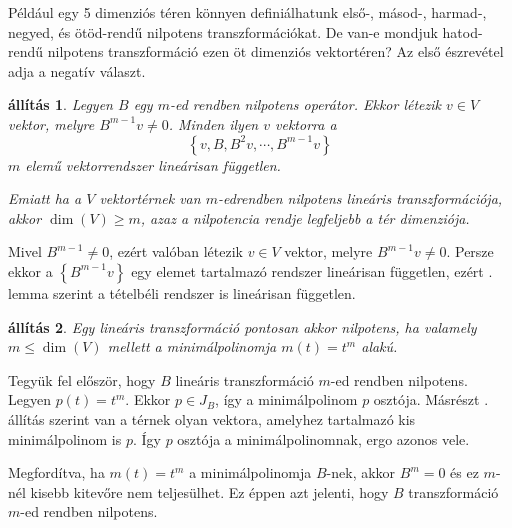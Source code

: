 \documentclass[a4paper, showtrims]{memoir}
\makeatletter
\renewenvironment{proof}[1][\proofname]
    {\par\pushQED{\qed}%
    \normalfont \topsep6\p@\@plus6\p@\relax
    \trivlist
    \item[\hskip\labelsep
        \itshape
    #1\@addpunct{:}]\ignorespaces}
    {\popQED\endtrivlist\@endpefalse}
\theoremstyle{plain}
\newtheorem{proposition}{állítás}[chapter]
\theoremstyle{remark}
\theoremstyle{definition}
\makeatother
\begin{document}
Például egy 5 dimenziós téren könnyen definiálhatunk első-, másod-, harmad-, negyed, és ötöd-rendű nilpotens transzformációkat.
De van-e mondjuk hatod-rendű nilpotens transzformáció ezen öt dimenziós vektortéren?
Az első észrevétel adja a negatív választ.
\begin{proposition}
	Legyen $B$ egy $m$-ed rendben nilpotens operátor.
	Ekkor létezik $v\in V$ vektor,
	melyre $B^{m-1}v\neq 0$.
	Minden ilyen $v$ vektorra a
	\[
		\left\{ v,B,B^2v,\cdots,B^{m-1}v \right\}
	\]
	$m$ elemű vektorrendszer lineárisan független.

	Emiatt ha a $V$ vektortérnek van $m$-edrendben nilpotens lineáris transzformációja, akkor $\dim(V)\geq m$,
	azaz a nilpotencia rendje legfeljebb a tér dimenziója.
	\label{th:fgtlen}
\end{proposition}
\begin{proof}
	Mivel $B^{m-1}\neq 0$, ezért valóban létezik $v\in V$ vektor,
	melyre $B^{m-1}v\neq 0$.
	Persze ekkor a $\left\{ B^{m-1}v \right\}$ egy elemet tartalmazó rendszer lineárisan független,
    ezért . lemma szerint a tételbéli rendszer is lineárisan független.
\end{proof}
\begin{proposition}
	Egy lineáris transzformáció pontosan akkor nilpotens,
	ha valamely $m\leq\dim(V)$ mellett a minimálpolinomja
	$m\left( t \right)=t^m$ alakú.
\end{proposition}
\begin{proof}
	Tegyük fel először, hogy $B$ lineáris transzformáció $m$-ed rendben
	nilpotens.
	Legyen $p\left( t \right)=t^m$.
	Ekkor $p\in J_B$, így a minimálpolinom $p$ osztója.
    Másrészt . állítás szerint van a térnek olyan vektora,
	amelyhez tartalmazó kis minimálpolinom is $p$.
	Így $p$ osztója a minimálpolinomnak, ergo azonos vele.

	Megfordítva, ha $m\left( t \right)=t^m$ a minimálpolinomja $B$-nek,
	akkor $B^m=0$ és ez $m$-nél kisebb kitevőre nem teljesülhet.
	Ez éppen azt jelenti, hogy $B$ transzformáció $m$-ed rendben nilpotens.
\end{proof}
\end{document}
